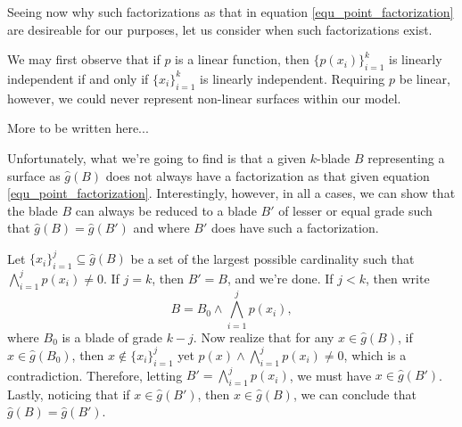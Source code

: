 \documentclass{birkjour}
\theoremstyle{definition}
\theoremstyle{remark}
\numberwithin{equation}{section}
\newcommand{\gh}{\hat{g}}
\begin{document}
Seeing now why such factorizations as that in equation \eqref{equ_point_factorization} are desireable for
our purposes, let us consider when such factorizations exist.

We may first observe that if $p$ is a linear function, then $\{p(x_i)\}_{i=1}^k$ is linearly
independent if and only if $\{x_i\}_{i=1}^k$ is linearly independent.
Requiring $p$ be linear, however, we could never represent non-linear surfaces within
our model.

More to be written here...

Unfortunately, what we're going to find is that a given $k$-blade $B$ representing
a surface as $\gh(B)$ does not always have a factorization as that
given equation \eqref{equ_point_factorization}.  Interestingly, however,
in all a cases, we can show that the blade $B$ can always be reduced to a blade
$B'$ of lesser or equal grade such that $\gh(B)=\gh(B')$ and where $B'$ does have
such a factorization.

Let $\{x_i\}_{i=1}^j\subseteq\gh(B)$ be a set of the largest possible cardinality such that
$\bigwedge_{i=1}^j p(x_i)\neq 0$.  If $j=k$, then $B'=B$, and we're done.  If $j<k$,
then write
\begin{equation*}
B = B_0\wedge\bigwedge_{i=1}^j p(x_i),
\end{equation*}
where $B_0$ is a blade of grade $k-j$.  Now realize that for any $x\in\gh(B)$, if
$x\in\gh(B_0)$, then $x\not\in\{x_i\}_{i=1}^j$ yet $p(x)\wedge\bigwedge_{i=1}^j p(x_i)\neq 0$,
which is a contradiction.  Therefore, letting $B'=\bigwedge_{i=1}^j p(x_i)$,
we must have $x\in\gh(B')$.  Lastly, noticing that if $x\in\gh(B')$, then $x\in\gh(B)$,
we can conclude that $\gh(B)=\gh(B')$.

\end{document}
